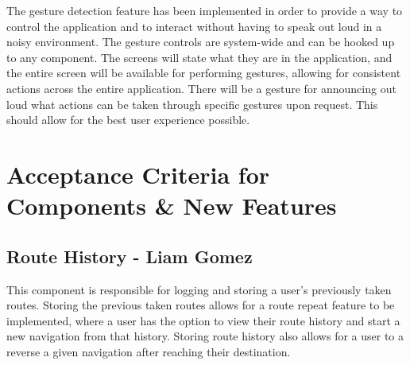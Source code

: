 \documentclass{scrreprt}
\begin{document}
\pagebreak

The gesture detection feature has been implemented in order to provide a way to control the application and to interact without having to speak out loud in a noisy environment. The gesture controls are system-wide and can be hooked up to any component. The screens will state what they are in the application, and the entire screen will be available for performing gestures, allowing for consistent actions across the entire application. There will be a gesture for announcing out loud what actions can be taken through specific gestures upon request. This should allow for the best user experience possible.

\chapter{Acceptance Criteria for Components \& New Features}

\section{Route History - Liam Gomez}

This component is responsible for logging and storing a user’s previously taken routes. Storing the previous taken routes allows for a route repeat feature to be implemented, where a user has the option to view their route history and start a new navigation from that history. Storing route history also allows for a user to a reverse a given navigation after reaching their destination.
\end{document}
